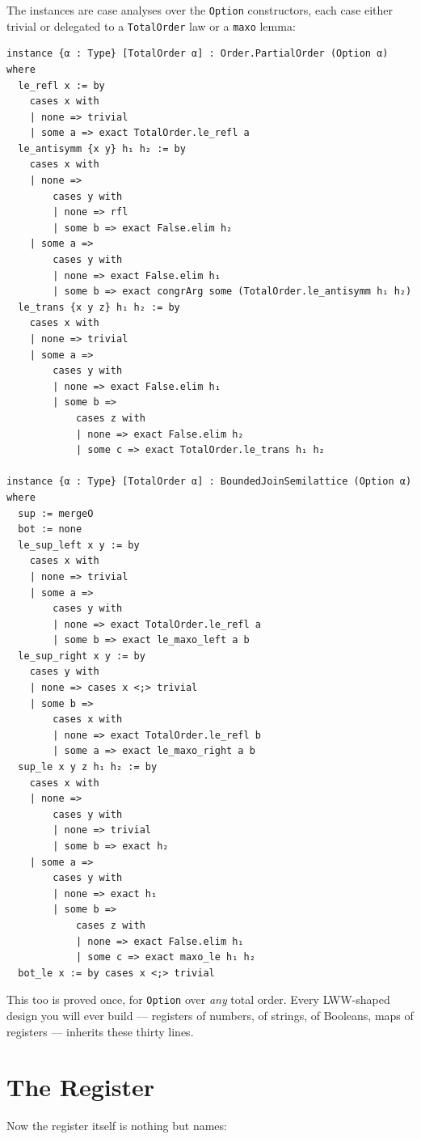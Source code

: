 \documentclass[12pt, a4paper, openright]{book}
\theoremstyle{thmstyle}
\theoremstyle{defstyle}
\newcommand{\lc}[1]{\texttt{#1}}
\begin{document}
The instances are case analyses over the \lc{Option} constructors, each
case either trivial or delegated to a \lc{TotalOrder} law or a
\lc{maxo} lemma:

\begin{verbatim}
instance {α : Type} [TotalOrder α] : Order.PartialOrder (Option α) where
  le_refl x := by
    cases x with
    | none => trivial
    | some a => exact TotalOrder.le_refl a
  le_antisymm {x y} h₁ h₂ := by
    cases x with
    | none =>
        cases y with
        | none => rfl
        | some b => exact False.elim h₂
    | some a =>
        cases y with
        | none => exact False.elim h₁
        | some b => exact congrArg some (TotalOrder.le_antisymm h₁ h₂)
  le_trans {x y z} h₁ h₂ := by
    cases x with
    | none => trivial
    | some a =>
        cases y with
        | none => exact False.elim h₁
        | some b =>
            cases z with
            | none => exact False.elim h₂
            | some c => exact TotalOrder.le_trans h₁ h₂

instance {α : Type} [TotalOrder α] : BoundedJoinSemilattice (Option α) where
  sup := mergeO
  bot := none
  le_sup_left x y := by
    cases x with
    | none => trivial
    | some a =>
        cases y with
        | none => exact TotalOrder.le_refl a
        | some b => exact le_maxo_left a b
  le_sup_right x y := by
    cases y with
    | none => cases x <;> trivial
    | some b =>
        cases x with
        | none => exact TotalOrder.le_refl b
        | some a => exact le_maxo_right a b
  sup_le x y z h₁ h₂ := by
    cases x with
    | none =>
        cases y with
        | none => trivial
        | some b => exact h₂
    | some a =>
        cases y with
        | none => exact h₁
        | some b =>
            cases z with
            | none => exact False.elim h₁
            | some c => exact maxo_le h₁ h₂
  bot_le x := by cases x <;> trivial
\end{verbatim}

This too is proved once, for \lc{Option} over \emph{any} total order.
Every LWW-shaped design you will ever build --- registers of numbers, of
strings, of Booleans, maps of registers --- inherits these thirty lines.

\section{The Register}
\label{sec:lww-reg}

Now the register itself is nothing but names:
\end{document}

